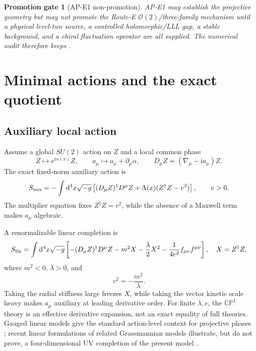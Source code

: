 \documentclass[11pt]{article}
\numberwithin{equation}{section}
\newcommand{\CP}{\mathbb{CP}}
\newcommand{\cO}{\mathcal O}
\newcommand{\dd}{\mathrm d}
\newcommand{\ii}{\mathrm i}
\newtheorem{gate}[theorem]{Promotion gate}
\begin{document}
\begin{gate}[AP-E1 non-promotion]
AP-E1 may establish the projective geometry but may not promote the Route-E
\(\cO(2)\)/three-family mechanism until a physical level-two source, a
controlled holomorphic/LLL gap, a stable background, and a chiral fluctuation
operator are all supplied.  The numerical audit therefore keeps
.
\end{gate}

\section{Minimal actions and the exact quotient}

\subsection{Auxiliary local action}

Assume a global \(SU(2)\) action on \(Z\) and a local common phase
\begin{equation}
 Z\longmapsto e^{\ii\alpha(x)}Z,
 \qquad
 a_\mu\longmapsto a_\mu+\partial_\mu\alpha,
 \qquad
 D_\mu Z=(\nabla_\mu-\ii a_\mu)Z.
 \label{eq:localgauge}
\end{equation}
The exact fixed-norm auxiliary action is
\begin{equation}
 S_{\rm aux}=-\int\dd^4x\sqrt{-g}\left[
 (D_\mu Z)^\dagger D^\mu Z+\Lambda(x)(Z^\dagger Z-v^2)\right],
 \qquad v>0.
 \label{eq:auxaction}
\end{equation}
The multiplier equation fixes \(Z^\dagger Z=v^2\), while the absence of a
Maxwell term makes \(a_\mu\) algebraic.

A renormalizable linear completion is
\begin{equation}
 S_{\rm lin}=\int\dd^4x\sqrt{-g}\left[-(D_\mu Z)^\dagger D^\mu Z
 -m^2X-\frac{\lambda}{2}X^2
 -\frac{1}{4e^2}f_{\mu\nu}f^{\mu\nu}\right],
 \quad X=Z^\dagger Z,
 \label{eq:linearaction}
\end{equation}
where \(m^2<0\), \(\lambda>0\), and
\begin{equation}
 v^2=-\frac{m^2}{\lambda}.
 \label{eq:vev}
\end{equation}
Taking the radial stiffness large freezes \(X\), while taking the vector
kinetic scale heavy makes \(a_\mu\) auxiliary at leading derivative order.
For finite \(\lambda,e\), the \(\CP^1\) theory is an effective derivative
expansion, not an exact equality of full theories.  Gauged linear models give
the standard action-level context for projective phases
\cite{Witten1993}; recent linear formulations of related Grassmannian models
illustrate, but do not prove, a four-dimensional UV completion of the present
model \cite{BykovKrivorol2024}.
\end{document}
